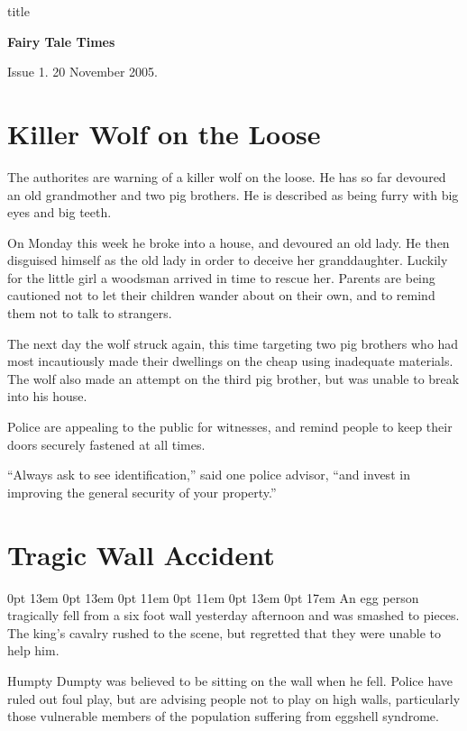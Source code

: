 \documentclass{article}
\begin{document}
\begin{staticcontents*}{title}
\begin{center}
\bfseries\Huge
Fairy Tale Times
\end{center}
\hfill Issue 1. 20 November 2005.
\end{staticcontents*}

\section{Killer Wolf on the Loose}

The authorites are warning of a killer wolf on the
loose. He has so far devoured an old grandmother and
two pig brothers. He is described as being furry with
big eyes and big teeth.

On Monday this week he broke into a house, and devoured
an old lady. He then disguised himself as the old lady
in order to deceive her granddaughter. Luckily for the little
girl a woodsman arrived in time to rescue her. Parents are
being cautioned not to let their children wander about on
their own, and to remind them not to talk to strangers.\par
\framebreak

The next day the wolf struck again, this time targeting two
pig brothers who had most incautiously made their dwellings
on the cheap using inadequate materials. The wolf also made
an attempt on the third pig brother, but was unable to break
into his house.

Police are appealing to the public for witnesses, and remind
people to keep their doors securely fastened at all times.

``Always ask to see identification,'' said one police advisor,
``and invest in improving the general security of your property.''

\framebreak
\section{Tragic Wall Accident}

{ 0pt 13em 0pt 13em 0pt 11em 0pt 11em 0pt 13em
0pt 17em
An egg person tragically fell from a six foot wall yesterday 
afternoon and was smash\-ed to pieces. The king's cavalry rushed
to the scene, but regretted that they  were unable to help him.
\par}

Humpty Dumpty was believed to be sitting
on the wall when he fell. Police have ruled out foul play, but
are advising people not to play on high walls, particularly
those vulnerable members of the population suffering from
eggshell syndrome.
\end{document}
